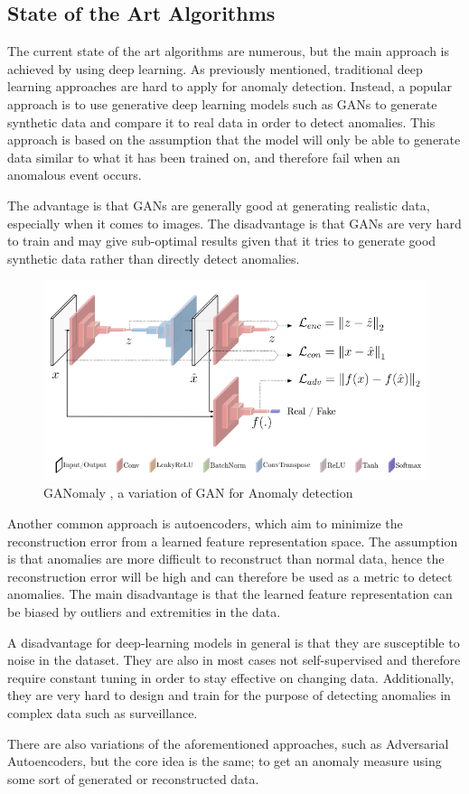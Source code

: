 \subsection{State of the Art Algorithms}
The current state of the art algorithms are numerous, but the main approach is achieved by using deep learning. As previously mentioned, traditional deep learning approaches are hard to apply for anomaly detection. Instead, a popular approach is to use generative deep learning models such as GANs to generate synthetic data and compare it to real data in order to detect anomalies. This approach is based on the assumption that the model will only be able to generate data similar to what it has been trained on, and therefore fail when an anomalous event occurs.
\par The advantage is that GANs are generally good at generating realistic data, especially when it comes to images. The disadvantage is that GANs are very hard to train and may give sub-optimal results given that it tries to generate good synthetic data rather than directly detect anomalies. \par
\begin{figure}[H]
    \centering
    \includegraphics[width=\linewidth]{resources/models/ganomaly.png}
    \caption{GANomaly \cite{ganomaly}, a variation of GAN for Anomaly detection}
    \label{fig:ganomaly}
\end{figure}
Another common approach is autoencoders, which aim to minimize the reconstruction error from a learned feature representation space. The assumption is that anomalies are more difficult to reconstruct than normal data, hence the reconstruction error will be high and can therefore be used as a metric to detect anomalies. The main disadvantage is that the learned feature representation can be biased by outliers and extremities in the data. \par
A disadvantage for deep-learning models in general is that they are susceptible to noise in the dataset. They are also in most cases not self-supervised and therefore require constant tuning in order to stay effective on changing data. Additionally, they are very hard to design and train for the purpose of detecting anomalies in complex data such as surveillance.\par
There are also variations of the aforementioned approaches, such as Adversarial Autoencoders, but the core idea is the same; to get an anomaly measure using some sort of generated or reconstructed data.

